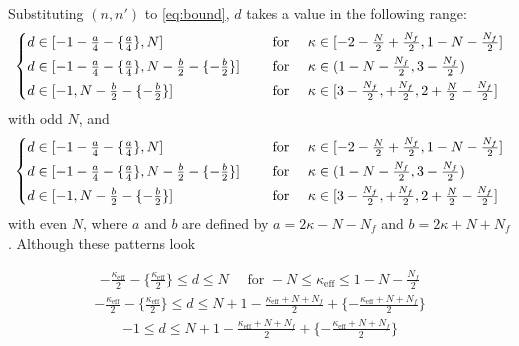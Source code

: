 \documentclass[letterpaper, 11pt]{article}
\def\k{\kappa}
\begin{document}
{Substituting $(n, n')$ to \eqref{eq:bound},  $d$ takes a value in the following range:
\begin{align}
  \begin{dcases}
    d \in [-1 - \tfrac{a}{4} - \{\tfrac{a}{4}\}, N] &\quad\text{ for }\quad \k \in [-2-\tfrac{N}{2}+\tfrac{N_f}{2}, 1-N-\tfrac{N_f}{2}] \\
    d \in [-1 - \tfrac{a}{4} - \{\tfrac{a}{4}\}, N-\tfrac{b}{2}-\{-\tfrac{b}{2}\}] &\quad\text{ for } \quad \k \in (1-N-\tfrac{N_f}{2}, 3-\tfrac{N_f}{2})\\
    d \in [-1, N-\tfrac{b}{2}-\{-\tfrac{b}{2}\}] &\quad\text{ for } \quad \k \in [3-\tfrac{N_f}{2}, +\tfrac{N_f}{2}, 2+\tfrac{N}{2}-\tfrac{N_f}{2}]
  \end{dcases}
\end{align}
with odd $N$, and 
\begin{align}
  \begin{dcases}
    d \in [-1 - \tfrac{a}{4} - \{\tfrac{a}{4}\}, N] &\quad\text{ for }\quad \k \in [-2-\tfrac{N}{2}+\tfrac{N_f}{2}, 1-N-\tfrac{N_f}{2}] \\
    d \in [-1 - \tfrac{a}{4} - \{\tfrac{a}{4}\}, N-\tfrac{b}{2}-\{-\tfrac{b}{2}\}] &\quad\text{ for } \quad \k \in (1-N-\tfrac{N_f}{2}, 3-\tfrac{N_f}{2})\\
    d \in [-1, N-\tfrac{b}{2}-\{-\tfrac{b}{2}\}] &\quad\text{ for } \quad \k \in [3-\tfrac{N_f}{2}, +\tfrac{N_f}{2}, 2+\tfrac{N}{2}-\tfrac{N_f}{2}]
  \end{dcases}
\end{align}
with even $N$, where $a$ and $b$ are defined by $a=2 \k-N-N_f$ and $b = 2\k+N+N_f$. Although these patterns look 
 

 \begin{align}
  -\frac{\k_\text{eff}}{2} - \{\frac{\k_\text{eff}}{2}\} \leq d \leq N \quad \text{ for } -N \leq \k_\text{eff}\leq 1-N-\frac{N_f}{2  }
 \end{align}
\begin{align}
 -\frac{\k_\text{eff}}{2}-\{\frac{\k_\text{eff}}{2}\} \leq d \leq N+1 -\frac{\k_\text{eff}+N+N_f}{2} + \{-\frac{\k_\text{eff}+N+N_f}{2}\}
\end{align}
\begin{align}
  -1 \leq d \leq N+1 -\frac{\k_\text{eff}+N+N_f}{2} + \{-\frac{\k_\text{eff}+N+N_f}{2}\}
 \end{align}

}
\end{document}
